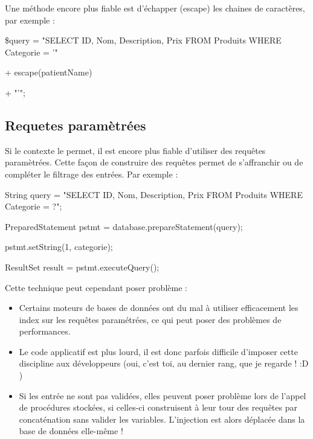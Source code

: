 Une méthode encore plus fiable est d'échapper (escape) les chaines de caractères, par exemple : 
\begin{tabbing}
\end{tabbing}

\$query =  "SELECT ID, Nom, Description, Prix FROM Produits WHERE Categorie = '"

+ escape(patientName)

+ "'";

\subsection{Requetes paramètrées}\label{vulnerabilites:web:sqli:countermeasures:parameterized}

Si le contexte le permet, il est encore plus fiable d'utiliser des requêtes paramètrées. Cette façon de construire des requêtes permet de s'affranchir ou de compléter le filtrage des entrées. Par exemple :
\begin{tabbing}
\end{tabbing}
String query = "SELECT ID, Nom, Description, Prix FROM Produits WHERE Categorie = ?";

PreparedStatement pstmt = database.prepareStatement(query);

pstmt.setString(1, categorie);

ResultSet result = pstmt.executeQuery();

\begin{tabbing}
\end{tabbing}
Cette technique peut cependant poser problème :
\begin{tabbing}
\end{tabbing}
\begin{itemize}
\item Certains moteurs de bases de données ont du mal à utiliser efficacement les index sur les requêtes paramétrées, ce qui peut poser des problèmes de performances.
\item Le code applicatif est plus lourd, il est donc parfois difficile d'imposer cette discipline aux développeurs (oui, c'est toi, au dernier rang, que je regarde ! :D )
\item Si les entrée ne sont pas validées, elles peuvent poser problème lors de l'appel de procédures stockées, si celles-ci construisent à leur tour des requêtes par concaténation sans valider les variables. L'injection est alors déplacée dans la base de données elle-même !
\end{itemize}


